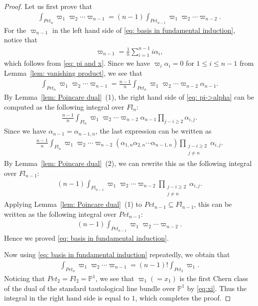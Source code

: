 \begin{proof}
Let us first prove that
\begin{align}\label{eq: basis in fundamental induction}
\int_{Pet_{n}}\varpi_1\varpi_2\cdots \varpi_{n-1} 
= (n-1) \int_{Pet_{n-1}}\varpi_1\varpi_2\cdots \varpi_{n-2}.
\end{align}
For the $\varpi_{n-1}$ in the left hand side of \eqref{eq: basis in fundamental induction}, notice that
\begin{align*}
\varpi_{n-1} = \frac{1}{n}\sum_{i=1}^{n-1} i\alpha_i ,
\end{align*}
which follows from \eqref{eq: pi and x}. Since we have $\varpi_i\alpha_i=0$ for $1\le i\le n-1$ from Lemma~\ref{lem: vanishing product}, we see that
\begin{align}\label{eq: pi->alpha}
\int_{Pet_{n}}\varpi_1\varpi_2\cdots \varpi_{n-1}
= \frac{n-1}{n}\int_{Pet_{n}}\varpi_1\varpi_2\cdots \varpi_{n-2}\alpha_{n-1}.
\end{align}
By Lemma~\ref{lem: Poincare dual}~(1), the right hand side of \eqref{eq: pi->alpha} can be computed as the following integral over $Fl_n$:
\begin{align*}
\frac{n-1}{n}\int_{Fl_n} \varpi_1\varpi_2\cdots \varpi_{n-2}\alpha_{n-1} \prod_{j-i\ge2}\alpha_{i,j}.
\end{align*}
Since we have $\alpha_{n-1}=\alpha_{n-1,n}$, the last expression can be written as
\begin{align*}
\frac{n-1}{n}\int_{Fl_n} \varpi_1\varpi_2\cdots \varpi_{n-2} (\alpha_{1,n}\alpha_{2,n}\cdots\alpha_{n-1,n})\prod_{\substack{j-i\ge2\\j\ne n}}\alpha_{i, j}.
\end{align*}
By Lemma~\ref{lem: Poincare dual}~(2), we can rewrite this as the following integral over $Fl_{n-1}$:
\begin{align*}
(n-1)\int_{Fl_{n-1}} \varpi_1\varpi_2\cdots \varpi_{n-2} \prod_{\substack{j-i\ge2\\j\ne n}}\alpha_{i, j}.
\end{align*}
Applying Lemma~\ref{lem: Poincare dual}~(1) to $Pet_{n-1}\subseteq Fl_{n-1}$, this can be written as the following integral over $Pet_{n-1}$:
\begin{align*}
(n-1)\int_{Pet_{n-1}} \varpi_1\varpi_2\cdots \varpi_{n-2} .
\end{align*}
Hence we proved \eqref{eq: basis in fundamental induction}.

Now using \eqref{eq: basis in fundamental induction} repeatedly, we obtain that
\begin{align*}
\int_{Pet_{n}}\varpi_1\varpi_2\cdots \varpi_{n-1}
= (n-1)! \int_{Pet_{2}}\varpi_1 .
\end{align*}
Noticing that $Pet_{2}=Fl_2={\mathbb P}^1$, we see that $\varpi_1(=x_1)$ is the first Chern class of the dual of the standard tautological line bundle over ${\mathbb P}^1$ by \eqref{eq:xi}. Thus the integral in the right hand side is equal to $1$, which completes the proof.
\end{proof}

